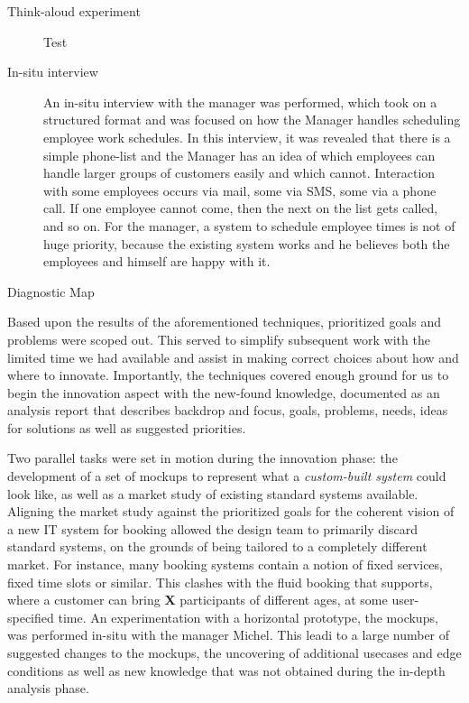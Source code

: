 \begin{description}
    \item [Think-aloud experiment] Test  
    \item [In-situ interview] An in-situ interview with the manager was
        performed, which took on a structured format and was focused on how the
        Manager handles scheduling employee work schedules. In this interview,
        it was revealed that there is a simple phone-list and the Manager has an
        idea of which employees can handle larger groups of customers easily and
        which cannot. Interaction with some employees occurs via mail, some via
        SMS, some via a phone call. If one employee cannot come, then the next
        on the list gets called, and so on. For the manager, a system to
        schedule employee times is not of huge priority, because the existing
        system works and he believes both the employees and himself are happy
        with it.
    \item [Diagnostic Map] 
\end{description}

Based upon the results of the aforementioned techniques, prioritized goals and
problems were scoped out. This served to simplify subsequent work with the
limited time we had available and assist in making correct choices about how and
where to innovate. Importantly, the techniques covered enough ground for us to
begin the innovation aspect with the new-found knowledge, documented as an
analysis report\cite[p. 159]{bodker2004participatory} that describes backdrop
and focus, goals, problems, needs, ideas for solutions as well as suggested
priorities.

Two parallel tasks were set in motion during the innovation phase: the
development of a set of mockups to represent what a \textit{custom-built system}
could look like, as well as a market study of existing standard systems
available. Aligning the market study against the prioritized goals for the
coherent vision of a new IT system for booking allowed the design team to
primarily discard standard systems, on the grounds of being tailored to a
completely different market. For instance, many booking systems contain a notion
of fixed services, fixed time slots or similar. This clashes with the fluid
booking that \gomonkey{} supports, where a customer can bring \textbf{X}
participants of different ages, at some user-specified time. An experimentation
with a horizontal prototype, the mockups, was performed in-situ with the manager
Michel. This leadi to a large number of suggested changes to the mockups, the uncovering of
additional usecases and edge conditions as well as new knowledge that was not obtained
during the in-depth analysis phase.

